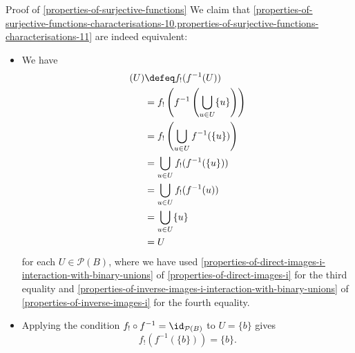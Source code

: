 \begin{Proof}{Proof of \cref{properties-of-surjective-functions}}
    We claim that \cref{properties-of-surjective-functions-characterisations-10,properties-of-surjective-functions-characterisations-11} are indeed equivalent:
    \begin{itemize}
        \item{}We have
            \begin{align*}
                [f_{!}\circ f^{-1}](U) &\defeq f_{!}(f^{-1}(U))\\
                                       &=      f_{!}\left(f^{-1}\left(\bigcup_{u\in U}\{u\}\right)\right)\\
                                       &=      f_{!}\left(\bigcup_{u\in U}f^{-1}(\{u\})\right)\\
                                       &=      \bigcup_{u\in U}f_{!}(f^{-1}(\{u\}))\\
                                       &=      \bigcup_{u\in U}f_{!}(f^{-1}(u))\\
                                       &=      \bigcup_{u\in U}\{u\}\\
                                       &=      U
            \end{align*}
            for each $U\in\mathcal{P}(B)$, where we have used \cref{properties-of-direct-images-i-interaction-with-binary-unions} of \cref{properties-of-direct-images-i} for the third equality and \cref{properties-of-inverse-images-i-interaction-with-binary-unions} of \cref{properties-of-inverse-images-i} for the fourth equality.
        \item{}Applying the condition $f_{!}\circ f^{-1}=\id_{\mathcal{P}(B)}$ to $U=\{b\}$ gives
            \[
                f_{!}(f^{-1}(\{b\}))%
                =%
                \{b\}.%
            \]%
    \end{itemize}


\end{Proof}
